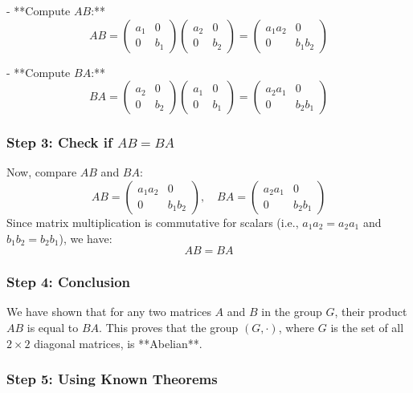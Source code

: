 \documentclass{article}
\begin{document}
- **Compute \( AB \):**
\[
AB = \begin{pmatrix} a_1 & 0 \\ 0 & b_1 \end{pmatrix} \begin{pmatrix} a_2 & 0 \\ 0 & b_2 \end{pmatrix} = \begin{pmatrix} a_1 a_2 & 0 \\ 0 & b_1 b_2 \end{pmatrix}
\]

- **Compute \( BA \):**
\[
BA = \begin{pmatrix} a_2 & 0 \\ 0 & b_2 \end{pmatrix} \begin{pmatrix} a_1 & 0 \\ 0 & b_1 \end{pmatrix} = \begin{pmatrix} a_2 a_1 & 0 \\ 0 & b_2 b_1 \end{pmatrix}
\]

\subsubsection*{Step 3: Check if \( AB = BA \)}

Now, compare \( AB \) and \( BA \):
\[
AB = \begin{pmatrix} a_1 a_2 & 0 \\ 0 & b_1 b_2 \end{pmatrix}, \quad BA = \begin{pmatrix} a_2 a_1 & 0 \\ 0 & b_2 b_1 \end{pmatrix}
\]
Since matrix multiplication is commutative for scalars (i.e., \( a_1 a_2 = a_2 a_1 \) and \( b_1 b_2 = b_2 b_1 \)), we have:
\[
AB = BA
\]

\subsubsection*{Step 4: Conclusion}

We have shown that for any two matrices \( A \) and \( B \) in the group \( G \), their product \( AB \) is equal to \( BA \). This proves that the group \( (G, \cdot) \), where \( G \) is the set of all \( 2 \times 2 \) diagonal matrices, is **Abelian**.

\subsubsection*{Step 5: Using Known Theorems}
\end{document}

